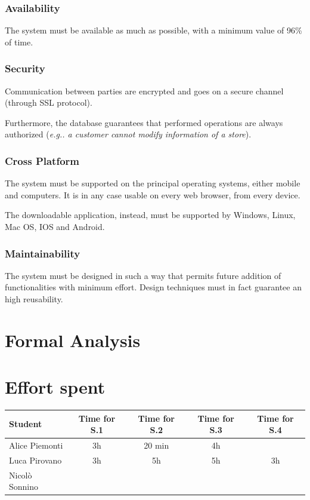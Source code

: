 \documentclass[table, 12pt]{article}
\begin{document}
\subsubsection{Availability}
The system must be available as much as possible, with a minimum value of 96\% of time.
\subsubsection{Security}
Communication between parties are encrypted and goes on a secure channel (through SSL protocol).

Furthermore, the database guarantees that performed operations are always authorized (\textit{e.g.. a customer cannot modify information of a store}).
\subsubsection{Cross Platform}
The system must be supported on the principal operating systems, either mobile and computers. It is in any case usable on every web browser, from every device.

The downloadable application, instead, must be supported by Windows, Linux, Mac OS, IOS and Android.
\subsubsection{Maintainability}
The system must be designed in such a way that permits future addition of functionalities with minimum effort.
Design techniques must in fact guarantee an high reusability.
\newpage
\section{Formal Analysis}
\newpage
\section{Effort spent}
\begin{tabular}{ | l || c | c | c | c |}
    \hline
    Student        & Time for S.1 & Time for S.2 & Time for S.3 & Time for S.4 \\ \hline
    Alice Piemonti & 3h           & 20 min       & 4h           &              \\ \hline
    Luca Pirovano  & 3h           & 5h           & 5h           & 3h           \\ \hline
    Nicolò Sonnino &              &              &              &              \\
    \hline
\end{tabular}
\end{document}
